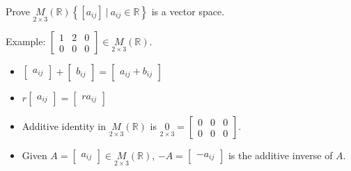 \documentclass[11pt,fleqn]{book} %
\begin{document}
\begin{example}
    Prove $\underset{2 \times 3}{M}(\mathbb{R}) \left\{ [a_{ij}] ~|~ a_{ij} \in \mathbb{R} \right\}$ is a vector space. 
    
    Example: $\begin{bmatrix}  1 &2 &0 \\ 0 &0 & 0 \end{bmatrix} \in \underset{2 \times 3}{M}(\mathbb{R})$. 
    \begin{itemize}
        \item $\begin{bmatrix} a_{ij} \end{bmatrix} + \begin{bmatrix} b_{ij} \end{bmatrix} = \begin{bmatrix} a_{ij}+b_{ij} \end{bmatrix}$

        \item $r\begin{bmatrix} a_{ij} \end{bmatrix} = \begin{bmatrix} ra_{ij} \end{bmatrix}$

        \item Additive identity in $\underset{2\times3}M(\mathbb{R})$ is $\underset{2\times3}{0} = \begin{bmatrix} 0&0&0\\0&0&0 \end{bmatrix}$. 

        \item Given $A = \begin{bmatrix} a_{ij} \end{bmatrix} \in \underset{2\times3}M(\mathbb{R})$, $-A = \begin{bmatrix} -a_{ij} \end{bmatrix}$ is the additive inverse of $A$. 
    \end{itemize}
\end{example}
\end{document}
